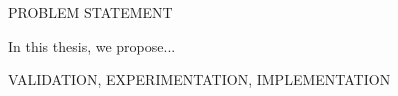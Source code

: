 \renewcommand{\sfdefault}{phv}
PROBLEM STATEMENT

In this thesis, we propose...

VALIDATION, EXPERIMENTATION, IMPLEMENTATION

